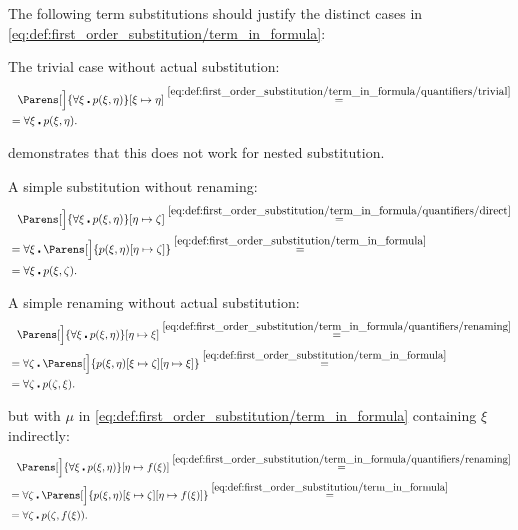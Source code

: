 \begin{example}\label{ex:first_order_substitution}
  The following term substitutions should justify the distinct cases in \eqref{eq:def:first_order_substitution/term_in_formula}:
  \begin{ExEnum}
     The trivial case without actual substitution:
    \begin{align*}
      &{}\phantom{=}{}
      \Parens[\Big]{\forall \xi \centerdot p(\xi, \eta)}[\xi \mapsto \eta]
      \overset {\eqref{eq:def:first_order_substitution/term_in_formula/quantifiers/trivial}} = \\ &=
      \forall \xi \centerdot p(\xi, \eta).
    \end{align*}

     demonstrates that this does not work for nested substitution.

     A simple substitution without renaming:
    \begin{align*}
      &{}\phantom{=}{}
      \Parens[\Big]{\forall \xi \centerdot p(\xi, \eta)}[\eta \mapsto \zeta]
      \overset {\eqref{eq:def:first_order_substitution/term_in_formula/quantifiers/direct}} = \\ &=
      \forall \xi \centerdot \Parens[\Big]{p(\xi, \eta)[\eta \mapsto \zeta]}
      \overset {\eqref{eq:def:first_order_substitution/term_in_formula}} = \\ &=
      \forall \xi \centerdot p(\xi, \zeta).
    \end{align*}

     A simple renaming without actual substitution:
    \begin{align*}
      &{}\phantom{=}{}
      \Parens[\Big]{\forall \xi \centerdot p(\xi, \eta)}[\eta \mapsto \xi]
      \overset {\eqref{eq:def:first_order_substitution/term_in_formula/quantifiers/renaming}} = \\ &=
      \forall \zeta \centerdot \Parens[\Big]{p(\xi, \eta)[\xi \mapsto \zeta][\eta \mapsto \xi]}
      \overset {\eqref{eq:def:first_order_substitution/term_in_formula}} = \\ &=
      \forall \zeta \centerdot p(\zeta, \xi).
    \end{align*}

      but with \( \mu \) in \eqref{eq:def:first_order_substitution/term_in_formula} containing \( \xi \) indirectly:
    \begin{align*}
      &{}\phantom{=}{}
      \Parens[\Big]{\forall \xi \centerdot p(\xi, \eta)}[\eta \mapsto f(\xi)]
      \overset {\eqref{eq:def:first_order_substitution/term_in_formula/quantifiers/renaming}} = \\ &=
      \forall \zeta \centerdot \Parens[\Big]{p(\xi, \eta)[\xi \mapsto \zeta][\eta \mapsto f(\xi)]}
      \overset {\eqref{eq:def:first_order_substitution/term_in_formula}} = \\ &=
      \forall \zeta \centerdot p(\zeta, f(\xi)).
    \end{align*}


\end{ExEnum}
\end{example}

